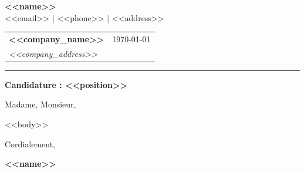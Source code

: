 \documentclass[11pt]{article}
\begin{document}
\noindent\colorbox{headerblue}{%
  \parbox{\dimexpr\textwidth-2\fboxsep}{%
    \vspace{12pt}
    \centering
    {\color{white}\LARGE\bfseries <<name>>}\\[4pt]
    {\color{white!80}\small <<email>> \enspace | \enspace <<phone>> \enspace | \enspace <<address>>}
    \vspace{10pt}
  }%
}

\vspace{1.5em}

\begin{tabularx}{\textwidth}{Xr}
  \textbf{<<company_name>>} & \today \\
  \textit{<<company_address>>} & \\
\end{tabularx}

\vspace{0.5em}

{\color{accentblue}\rule{\linewidth}{0.5pt}}

\vspace{0.5em}

{\large\bfseries\color{headerblue} Candidature : <<position>>}

\vspace{0.5em}

{\color{textgray}
Madame, Monsieur,

<<body>>
}

\vspace{1.5em}

Cordialement,

\vspace{1.5em}

{\bfseries <<name>>}
\end{document}
